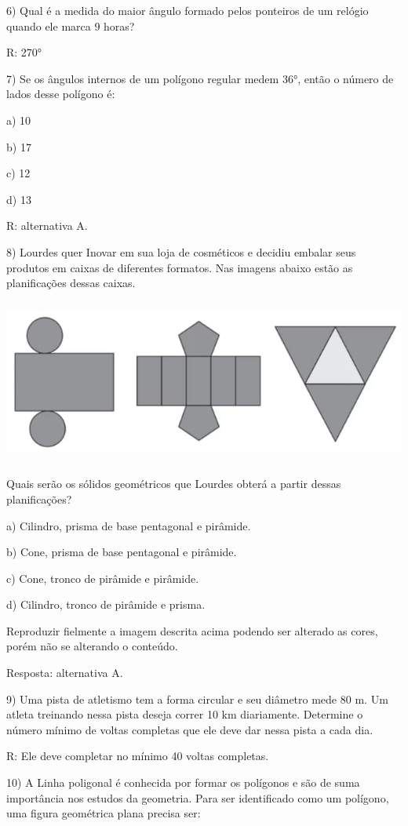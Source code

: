 6) Qual é a medida do maior ângulo formado pelos ponteiros de um relógio
quando ele marca 9 horas?

R: 270°

7) Se os ângulos internos de um polígono regular medem 36°, então o
número de lados desse polígono é:

a) 10

b) 17

c) 12

d) 13

R: alternativa A.

8) Lourdes quer Inovar em sua loja de cosméticos e decidiu embalar seus
produtos em caixas de diferentes formatos. Nas imagens abaixo estão as
planificações dessas caixas.

\includegraphics[width=5.90625in,height=2.125in]{./imgSAEB_6_MAT/media/image51.png}

Quais serão os sólidos geométricos que Lourdes obterá a partir dessas
planificações?

a) Cilindro, prisma de base pentagonal e pirâmide.

b) Cone, prisma de base pentagonal e pirâmide.

c) Cone, tronco de pirâmide e pirâmide.

d) Cilindro, tronco de pirâmide e prisma.

Reproduzir fielmente a imagem descrita acima podendo ser alterado as
cores, porém não se alterando o conteúdo.

Resposta: alternativa A.

9) Uma pista de atletismo tem a forma circular e seu diâmetro mede 80 m.
Um atleta treinando nessa pista deseja correr 10 km diariamente.
Determine o número mínimo de voltas completas que ele deve dar nessa
pista a cada dia.

R: Ele deve completar no mínimo 40 voltas completas.

10) A Linha poligonal é conhecida por formar os polígonos e são de suma
importância nos estudos da geometria. Para ser identificado como um
polígono, uma figura geométrica plana precisa ser:

